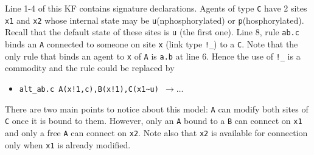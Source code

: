 \documentclass[11pt]{book}
\def\int{\hbox{\texttt{\~}}}
\def\ttt#1{\texttt{#1}}
\def\var#1{\textquotesingle #1\textquotesingle}
\def\rar{\rightarrow}
\def\ITE#1{\begin{itemize}#1\end{itemize}}
\begin{document}
Line 1-4 of this KF contains signature declarations. Agents of type \ttt{C} have 2 sites \ttt{x1} and \ttt{x2} whose internal state may be \ttt{u}(nphosphorylated) or \ttt{p}(hosphorylated). Recall that the default state of these sites is \ttt{u} (the first one). Line 8, rule \ttt{\textquotesingle ab.c\textquotesingle } binds an \ttt{A} connected to someone on site \ttt{x} (link type \ttt{!\_}) to a \ttt{C}. Note that the only rule that binds an agent to \ttt{x} of \ttt{A} is \ttt{\textquotesingle a.b\textquotesingle } at line 6. Hence the use of \ttt{!\_} is a commodity and the rule could be replaced by 
\ITE{
\item[]\ttt{\var{alt\_ab.c} A(x!1,c),B(x!1),C(x1\int u) $\rar\dots$}
}
There are two main points to notice about this model: \ttt{A} can modify both sites of \ttt{C} once it is bound to them. However, only an \ttt{A} bound to a \ttt{B} can connect on \ttt{x1} and only a free \ttt{A} can connect on \ttt{x2}. Note also that \ttt{x2} is available for connection only when \ttt{x1} is already modified. 
\end{document}

